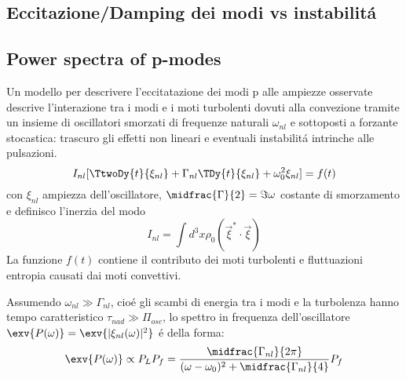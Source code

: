 \begin{refsection}

\section{Eccitazione/Damping dei modi vs instabilit\'a}

\begingroup
\nocite{*}
\let\clearpage\relax

\printbibliography[filter=smodesexcitation,keyword={rev},heading=bibintoc,title={\textcolor{amber}{Biblio about: ''Eccitazione modi solari''}}]
\printbibliography[filter=smodesexcitation,notkeyword={rev},heading=bibintoc,title={\textcolor{amber}{Other refs about: ''Eccitazione modi solari''}}]

\endgroup

\subsection{Power spectra of p-modes}

Un modello per descrivere l'eccitatazione dei modi p alle ampiezze osservate descrive l'interazione tra i modi e i moti turbolenti dovuti alla convezione tramite un insieme di oscillatori smorzati di frequenze naturali $\omega_{nl}$ e sottoposti a forzante stocastica: trascuro gli effetti non lineari e eventuali instabilit\'a intrinche alle pulsazioni.
\begin{equation}
I_{nl}[\TtwoDy{t}{\xi_{nl}}+\Gamma_{nl}\TDy{t}{\xi_{nl}}+\omega_0^2\xi_{nl}]=f(t)
\end{equation}
con $\xi_{nl}$ ampiezza dell'oscillatore, $\midfrac{\Gamma}{2}=\Im{\omega}$ costante di smorzamento e definisco l'inerzia del modo
\begin{equation}
I_{nl}=\int d^3x\rho_0(\vec{\xi}^*\cdot\vec{\xi})\label{eq:modeinertia}
\end{equation}
La funzione $f(t)$ contiene il contributo dei moti turbolenti e fluttuazioni entropia causati dai moti convettivi.

Assumendo $\omega_{nl}\gg\Gamma_{nl}$, cio\'e gli scambi di energia tra i modi e la turbolenza hanno tempo caratteristico $\tau_{nad}\gg\Pi_{osc}$, lo spettro in frequenza dell'oscillatore $\exv{P(\omega)}=\exv{|\xi_{nl}(\omega)|^2}$ \'e della forma:
\begin{equation}
\exv{P(\omega)}\propto P_LP_f=\frac{\midfrac{\Gamma_{nl}}{2\pi}}{(\omega-\omega_0)^2+\midfrac{\Gamma_{nl}}{4}}P_f
\end{equation}



\end{refsection}
